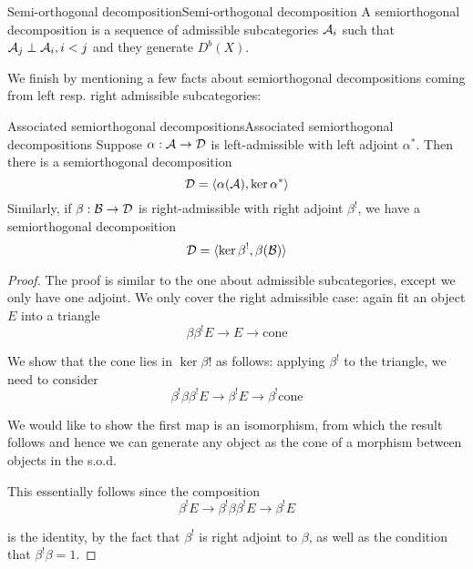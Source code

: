 
\begin{definition}{Semi-orthogonal decomposition}{Semi-orthogonal decomposition}
    A semiorthogonal decomposition is a sequence of admissible subcategories $\mathcal{A}_{i}$ such that $\mathcal{A}_{j}\perp \mathcal{A}_{i}, i<j$ and they generate $D^b(X)$.
\end{definition}

We finish by mentioning a few facts about semiorthogonal decompositions coming from left resp. right admissible subcategories:

\begin{proposition}{Associated semiorthogonal decompositions}{Associated semiorthogonal decompositions}
    Suppose $\alpha: \mathcal{A} \rightarrow \mathcal{D}$ is left-admissible with left adjoint $\alpha^*$. Then there is a semiorthogonal decomposition $$\mathcal{D} = \langle \alpha(\mathcal{A}), \ker \alpha^*\rangle $$
    Similarly, if $\beta:\mathcal{B}\rightarrow \mathcal{D}$ is right-admissible with right adjoint $\beta^!$, we have a semiorthogonal decomposition $$\mathcal{D}=\langle \ker \beta^!, \beta(\mathcal{B})\rangle$$
\end{proposition}

\begin{proof}
    The proof is similar to the one about admissible subcategories, except we only have one adjoint. We only cover the right admissible case: again fit an object $E$ into a triangle $$\beta \beta^! E \rightarrow E \rightarrow \mathrm{cone}$$

    We show that the cone lies in $\ker \beta!$ as follows: applying $\beta^!$ to the triangle, we need to consider $$\beta^! \beta \beta^!E \rightarrow \beta^! E\rightarrow \beta^! \mathrm{cone}$$

    We would like to show the first map is an isomorphism, from which the result follows and hence we can generate any object as the cone of a morphism between objects in the s.o.d.

    This essentially follows since the composition $$\beta^!E \rightarrow \beta^! \beta \beta^! E \rightarrow \beta^!E$$

    is the identity, by the fact that $\beta^!$ is right adjoint to $\beta$, as well as the condition that $\beta^!\beta=1$. 
\end{proof}

